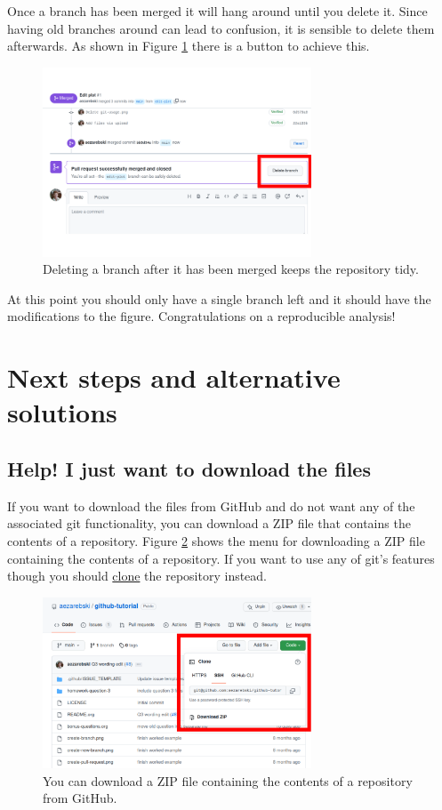 \documentclass[11pt,onecolumn]{scrartcl}
\begin{document}
Once a branch has been merged it will hang around until you delete it. Since
having old branches around can lead to confusion, it is sensible to delete them
afterwards. As shown in Figure \ref{fig:delete-branch} there is a button to achieve
this.

\begin{figure}[htbp]
\centering
\includegraphics[width=8cm]{./delete-branch.png}
\caption{\label{fig:delete-branch}Deleting a branch after it has been merged keeps the repository tidy.}
\end{figure}

At this point you should only have a single branch left and it should have the
modifications to the figure. Congratulations on a reproducible analysis!

\section{Next steps and alternative solutions}
\label{sec:orgb20342f}

\subsection{Help! I just want to download the files}
\label{sec:orgac9079d}

If you want to download the files from GitHub and do not want any of the
associated git functionality, you can download a ZIP file that contains the
contents of a repository. Figure \ref{fig:download-zip-file} shows the menu for
downloading a ZIP file containing the contents of a repository. If you want to
use any of git's features though you should \hyperref[sec:orgd9fcb88]{clone} the repository instead.

\begin{figure}[htbp]
\centering
\includegraphics[width=8cm]{./download-zip-file.png}
\caption{\label{fig:download-zip-file}You can download a ZIP file containing the contents of a repository from GitHub.}
\end{figure}
\end{document}
